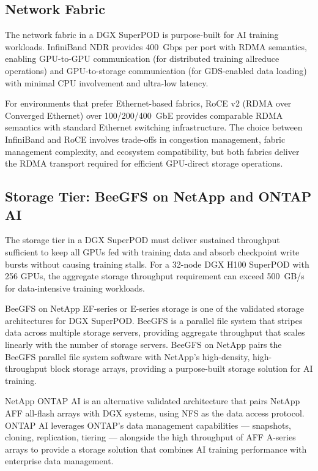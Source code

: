 \subsection{Network Fabric}

The network fabric in a DGX SuperPOD is purpose-built for AI training
workloads. InfiniBand NDR provides 400~Gbps per port with RDMA semantics,
enabling GPU-to-GPU communication (for distributed training allreduce
operations) and GPU-to-storage communication (for GDS-enabled data loading)
with minimal CPU involvement and ultra-low latency.

For environments that prefer Ethernet-based fabrics, RoCE v2 (RDMA over
Converged Ethernet) over 100/200/400~GbE provides comparable RDMA semantics
with standard Ethernet switching infrastructure. The choice between
InfiniBand and RoCE involves trade-offs in congestion management, fabric
management complexity, and ecosystem compatibility, but both fabrics deliver
the RDMA transport required for efficient GPU-direct storage operations.

\subsection{Storage Tier: BeeGFS on NetApp and ONTAP AI}

The storage tier in a DGX SuperPOD must deliver sustained throughput
sufficient to keep all GPUs fed with training data and absorb checkpoint write
bursts without causing training stalls. For a 32-node DGX H100 SuperPOD with
256 GPUs, the aggregate storage throughput requirement can exceed 500~GB/s for
data-intensive training workloads.

BeeGFS on NetApp EF-series or E-series storage is one of the validated storage
architectures for DGX SuperPOD. BeeGFS is a parallel file system that stripes
data across multiple storage servers, providing aggregate throughput that
scales linearly with the number of storage servers. BeeGFS on NetApp pairs the
BeeGFS parallel file system software with NetApp's high-density,
high-throughput block storage arrays, providing a purpose-built storage
solution for AI training.

NetApp ONTAP AI is an alternative validated architecture that pairs NetApp AFF
all-flash arrays with DGX systems, using NFS as the data access protocol.
ONTAP AI leverages ONTAP's data management capabilities --- snapshots,
cloning, replication, tiering --- alongside the high throughput of AFF
A-series arrays to provide a storage solution that combines AI training
performance with enterprise data management.

